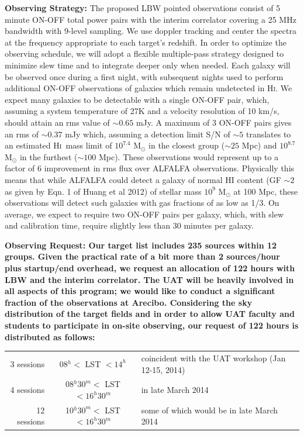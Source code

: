 \documentclass[11pt]{article}
\newcommand{\HI}{H\textsc{i}}
\begin{document}
{\bf Observing Strategy:} \hskip 5pt The proposed LBW pointed observations consist of 5 minute ON-OFF total
power pairs with the interim correlator covering a 25 MHz bandwidth
with 9-level sampling. We use doppler tracking and center the spectra
at the frequency appropriate to each target's redshift. In order to optimize the observing
schedule, we will adopt a flexible multiple-pass strategy designed to minimize slew time
and to integrate deeper only when needed.
Each galaxy will be observed once during a first night, with
subsequent nights used to perform additional ON-OFF observations of galaxies which
remain undetected in \HI. We expect many galaxies to be detectable with a single
ON-OFF pair, which, assuming a system temperature of 27K and a velocity resolution of
10 km/s, should attain an rms value of $\sim0.65$ mJy. A maximum of 3 ON-OFF pairs
gives an rms of $\sim0.37$ mJy which, assuming a detection limit S/N of $\sim5$
translates to an estimated \HI\ mass limit of
$10^{7.4}$ M$_\odot$ in the
closest group ($\sim25$ Mpc) and $10^{8.7}$ M$_\odot$ in the furthest ($\sim100$ Mpc).
These observations would represent up to a factor of 6 improvement in rms flux over
ALFALFA observations. Physically this means that while ALFALFA could detect a galaxy of
normal HI content (GF $\sim 2$ as given by Eqn. 1 of Huang {et al} 2012) of stellar mass
$10^9$ M$_\odot$ at 100 Mpc, these observations will detect such galaxies
with gas fractions of as low as 1/3.
On average, we expect to require two ON-OFF pairs
per galaxy, which, with slew and calibration time, require slightly less than 30 minutes
per galaxy.


\bf Observing Request: \rm Our target list includes 235 sources within 12 groups. Given the
practical rate of a bit more than 2 sources/hour plus startup/end overhead, we request an allocation
of 122 hours with LBW and the interim correlator. The UAT will be heavily involved in all aspects
of this program; we would like to conduct a significant fraction of the
observations at Arecibo. Considering the sky distribution of the
target fields and in order to allow UAT faculty and students to participate in on-site observing,
our request of 122 hours is distributed as follows:
\begin{center}
\vskip -8pt
\begin{tabular}{rcl}
3 sessions  & 08$^h <$ LST $< 14^h$             & coincident with the UAT workshop (Jan 12-15, 2014)\\
4 sessions  & 08$^h30^m <$ LST $< 16^h30^m$      & in late March 2014\\
12 sessions & 10$^h30^m <$ LST $< 16^h30^m$      & some of which would be in late March 2014
\end{tabular}
\end{center}
\end{document}
